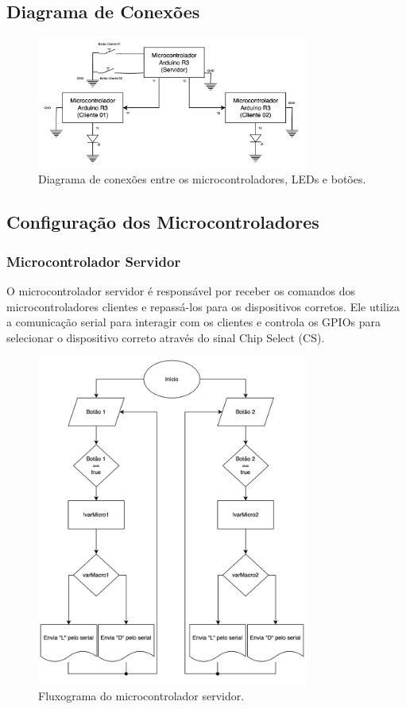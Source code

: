 \documentclass[12pt, a4paper]{article}
\begin{document}
\subsection{Diagrama de Conexões}
\begin{figure}[H]
	\centering
	\includegraphics[width=0.8\textwidth]{diagrama_conexoes.png}
	\caption{Diagrama de conexões entre os microcontroladores, LEDs e botões.}
	\label{fig:diagrama_conexoes}
\end{figure}
\subsection{Configuração dos Microcontroladores}
\subsubsection{Microcontrolador Servidor}
O microcontrolador servidor é responsável por receber os comandos dos microcontroladores clientes e repassá-los para os dispositivos corretos. Ele utiliza a comunicação serial para interagir com os clientes e controla os GPIOs para selecionar o dispositivo correto através do sinal Chip Select (CS).
\begin{figure}[H]
	\centering
	\includegraphics[width=0.8\textwidth]{fluxograma_servidor.png}
	\caption{Fluxograma do microcontrolador servidor.}
	\label{fig:fluxograma_servidor}
\end{figure}
\end{document}
